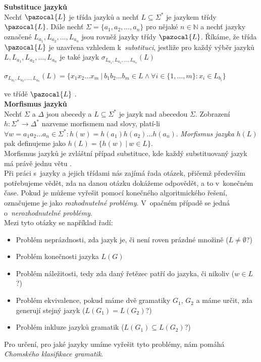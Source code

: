 \textbf{Substituce jazyků} \\
Nechť $\pazocal{L}$ je třída jazyků a nechť $L \subseteq \Sigma^*$ je jazykem třídy $\pazocal{L}$. Dále nechť 
$\Sigma = \{a_1, a_2, \dots, a_n\}$ 
pro nějaké $n\in \mathbb{N}$ a nechť jazyky označené $L_{a_1}, L_{a_2}, \dots, L_{a_n}$ jsou rovněž jazyky třídy 
$\pazocal{L}$. Říkáme, že třída $\pazocal{L}$ je uzavřena vzhledem k~\textit{substituci}, jestliže pro každý výběr jazyků 
$L, L_{a_1}, L_{a_2}, \dots, L_{a_n}$ je také jazyk 
$\sigma_{L_{a_1}, L_{a_2}, \dots, L_{a_n}}(L)$
\begin{center}
$\sigma_{L_{a_1}, L_{a_2}, \dots, L_{a_n}}(L) = \{x_1 x_2 \dots x_m \ | \ b_1 b_2 \dots b_m \in L \wedge \forall i \in 
\{1, \dots, m\}: x_i \in L_{b_i}\}$ 
\end{center}
ve třídě $\pazocal{L}$ \cite[str. 95]{TIN2013}. \\

\textbf{Morfismus jazyků} \\
Nechť $\Sigma$ a $\Delta$ jsou abecedy a $L \subseteq \Sigma^*$ je jazyk nad abecedou $\Sigma$. Zobrazení $h: \Sigma^* \rightarrow \Delta^*$ 
nazveme morfismem nad slovy, platí-li $\forall w = a_1 a_2 \dots a_n \in \Sigma^*: h(w) = h(a_1) h(a_2) \dots h(a_n)$. 
\textit{Morfismus jazyka} $h(L)$ pak definujeme jako $h(L) = \{h(w) \ | \ w \in L\}$. \\ 
Morfismus jazyků je zvláštní případ substituce, kde každý substituovaný jazyk má právě jednu větu \cite[str. 95]{TIN2013}. \\

Při práci s~jazyky a jejich třídami nás zajímá řada otázek, přičemž především potřebujeme vědět, zda na danou otázku dokážeme odpovědět, a to 
v~konečném čase. Pokud je můžeme vyřešit pomocí konečného algoritmického řešení, označujeme je jako \textit{rozhodnutelné problémy}. 
V~opačném případě se jedná o~\textit{nerozhodnutelné problémy}. \\

Mezi tyto otázky se například řadí:
\begin{itemize}
\item Problém neprázdnosti, zda jazyk je, či není roven prázdné množině ($L \neq \emptyset$?)
\item Problém konečnosti jazyka $L(G)$
\item Problém náležitosti, tedy zda daný řetězec patří do jazyka, či nikoliv ($w \in L$?)
\item Problém ekvivalence, pokud máme dvě gramatiky $G_1$, $G_2$ a máme určit, zda generují stejný jazyk ($L(G_1) = L(G_2)$?)
\item Problém inkluze jazyků gramatik ($L(G_1) \subseteq L(G_2)$?)
\end{itemize}
\vspace*{\baselineskip}
Pro určení, pro jaké jazyky umíme vyřešit tyto problémy, nám pomáhá \textit{Chomského klasifikace gramatik}.

